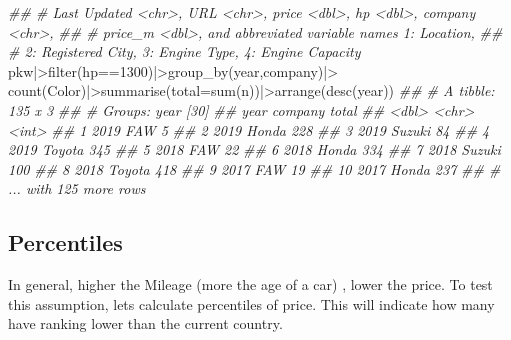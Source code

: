 \documentclass[
  letterpaper,
  DIV=11,
  numbers=noendperiod]{scrartcl}
\newenvironment{Shaded}{\begin{snugshade}}{\end{snugshade}}
\newcommand{\AttributeTok}[1]{\textcolor[rgb]{0.40,0.45,0.13}{#1}}
\newcommand{\DecValTok}[1]{\textcolor[rgb]{0.68,0.00,0.00}{#1}}
\newcommand{\DocumentationTok}[1]{\textcolor[rgb]{0.37,0.37,0.37}{\textit{#1}}}
\newcommand{\FunctionTok}[1]{\textcolor[rgb]{0.28,0.35,0.67}{#1}}
\newcommand{\NormalTok}[1]{\textcolor[rgb]{0.00,0.23,0.31}{#1}}
\newcommand{\SpecialCharTok}[1]{\textcolor[rgb]{0.37,0.37,0.37}{#1}}
\begin{document}
\begin{Shaded}
\begin{Highlighting}[]
\DocumentationTok{\#\# \#   \textasciigrave{}Last Updated\textasciigrave{} \textless{}chr\textgreater{}, URL \textless{}chr\textgreater{}, price \textless{}dbl\textgreater{}, hp \textless{}dbl\textgreater{}, company \textless{}chr\textgreater{},}
\DocumentationTok{\#\# \#   price\_m \textless{}dbl\textgreater{}, and abbreviated variable names 1: Location,}
\DocumentationTok{\#\# \#   2: \textasciigrave{}Registered City\textasciigrave{}, 3: \textasciigrave{}Engine Type\textasciigrave{}, 4: \textasciigrave{}Engine Capacity\textasciigrave{}}
\NormalTok{pkw}\SpecialCharTok{|\textgreater{}}\FunctionTok{filter}\NormalTok{(hp}\SpecialCharTok{==}\DecValTok{1300}\NormalTok{)}\SpecialCharTok{|\textgreater{}}\FunctionTok{group\_by}\NormalTok{(year,company)}\SpecialCharTok{|\textgreater{}}
  \FunctionTok{count}\NormalTok{(Color)}\SpecialCharTok{|\textgreater{}}\FunctionTok{summarise}\NormalTok{(}\AttributeTok{total=}\FunctionTok{sum}\NormalTok{(n))}\SpecialCharTok{|\textgreater{}}\FunctionTok{arrange}\NormalTok{(}\FunctionTok{desc}\NormalTok{(year))}
\DocumentationTok{\#\# \# A tibble: 135 x 3}
\DocumentationTok{\#\# \# Groups:   year [30]}
\DocumentationTok{\#\#     year company total}
\DocumentationTok{\#\#    \textless{}dbl\textgreater{} \textless{}chr\textgreater{}   \textless{}int\textgreater{}}
\DocumentationTok{\#\#  1  2019 FAW         5}
\DocumentationTok{\#\#  2  2019 Honda     228}
\DocumentationTok{\#\#  3  2019 Suzuki     84}
\DocumentationTok{\#\#  4  2019 Toyota    345}
\DocumentationTok{\#\#  5  2018 FAW        22}
\DocumentationTok{\#\#  6  2018 Honda     334}
\DocumentationTok{\#\#  7  2018 Suzuki    100}
\DocumentationTok{\#\#  8  2018 Toyota    418}
\DocumentationTok{\#\#  9  2017 FAW        19}
\DocumentationTok{\#\# 10  2017 Honda     237}
\DocumentationTok{\#\# \# ... with 125 more rows}
\end{Highlighting}
\end{Shaded}

\hypertarget{percentiles}{%
\subsection{Percentiles}\label{percentiles}}

In general, higher the Mileage (more the age of a car) , lower the
price. To test this assumption, lets calculate percentiles of price.
This will indicate how many have ranking lower than the current country.
\end{document}

